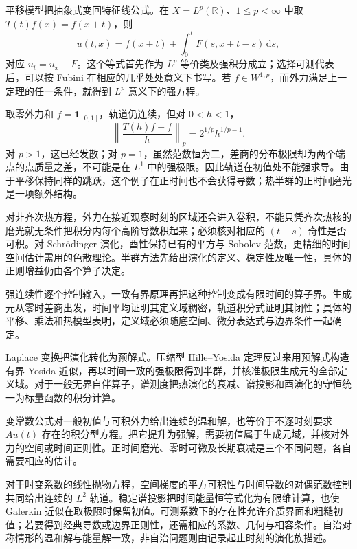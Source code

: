 \ProseParagraphBreak

平移模型把抽象式变回特征线公式。在 \(X=L^p(\mathbb R)\)、\(1\leq p<\infty\) 中取 \(T(t)f(x)=f(x+t)\)，则
\[
 u(t,x)=f(x+t)+\int_0^tF(s,x+t-s)\,\mathrm ds,
\]
对应 \(u_t=u_x+F\)。这个等式首先作为 \(L^p\) 等价类及强积分成立；选择可测代表后，可以按 Fubini 在相应的几乎处处意义下书写。若 \(f\in W^{1,p}\)，而外力满足上一定理的任一条件，就得到 \(L^p\) 意义下的强方程。

\ProseParagraphBreak

取零外力和 \(f=\mathbf1_{[0,1]}\)，轨道仍连续，但对 \(0<h<1\)，
\[
 \left\|\frac{T(h)f-f}{h}\right\|_p
 =2^{1/p}h^{1/p-1}.
\]
对 \(p>1\)，这已经发散；对 \(p=1\)，虽然范数恒为二，差商的分布极限却为两个端点的点质量之差，不可能是在 \(L^1\) 中的强极限。因此轨道在初值处不能强求导。由于平移保持同样的跳跃，这个例子在正时间也不会获得导数；热半群的正时间磨光是一项额外结构。

\ProseParagraphBreak

对非齐次热方程，外力在接近观察时刻的区域还会进入卷积，不能只凭齐次热核的磨光就无条件把积分内每个高阶导数积起来；必须核对相应的 \((t-s)\) 奇性是否可积。对 Schrödinger 演化，酉性保持已有的平方与 Sobolev 范数，更精细的时间空间估计需用的色散理论。半群方法先给出演化的定义、稳定性及唯一性，具体的正则增益仍由各个算子决定。



\begin{chaptersummary}
强连续性逐个控制输入，一致有界原理再把这种控制变成有限时间的算子界。生成元从零时差商出发，时间平均证明其定义域稠密，轨道积分式证明其闭性；具体的平移、乘法和热模型表明，定义域必须随底空间、微分表达式与边界条件一起确定。

\ProseParagraphBreak

Laplace 变换把演化转化为预解式。压缩型 Hille--Yosida 定理反过来用预解式构造有界 Yosida 近似，再以时间一致的强极限得到半群，并核准极限生成元的全部定义域。对于一般无界自伴算子，谱测度把热演化的衰减、谱投影和酉演化的守恒统一为标量函数的积分计算。

\ProseParagraphBreak

变常数公式对一般初值与可积外力给出连续的温和解，也等价于不逐时刻要求 \(Au(t)\) 存在的积分型方程。把它提升为强解，需要初值属于生成元域，并核对外力的空间或时间正则性。正时间磨光、零时可微及长期衰减是三个不同问题，各自需要相应的估计。

\ProseParagraphBreak

对于时变系数的线性抛物方程，空间梯度的平方可积性与时间导数的对偶范数控制共同给出连续的 \(L^2\) 轨道。稳定谱投影把时间能量恒等式化为有限维计算，也使 Galerkin 近似在取极限时保留初值。可测系数下的存在性允许介质界面和粗糙初值；若要得到经典导数或边界正则性，还需相应的系数、几何与相容条件。自治对称情形的温和解与能量解一致，非自治问题则由记录起止时刻的演化族描述。
\end{chaptersummary}

